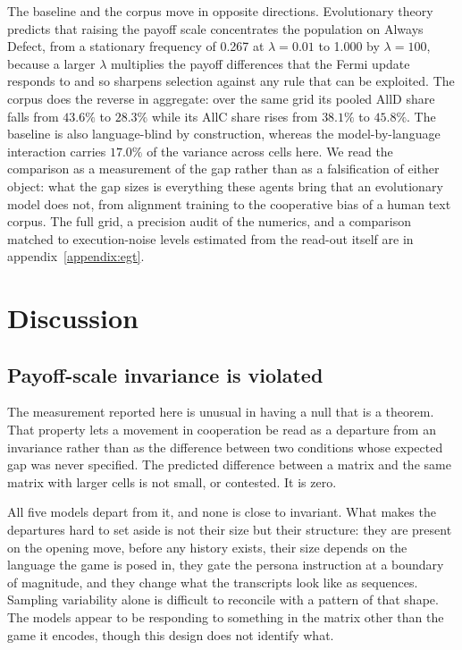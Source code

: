 \documentclass[openacc]{rsproca_new}
\newcommand{\lam}{\lambda}
\begin{document}
The baseline and the corpus move in opposite directions. Evolutionary theory
predicts that raising the payoff scale concentrates the population on Always
Defect, from a stationary frequency of 0.267 at $\lam = 0.01$ to 1.000 by
$\lam = 100$, because a larger $\lam$ multiplies the payoff differences that
the Fermi update responds to and so sharpens selection against any rule that
can be exploited. The corpus does the
reverse in aggregate: over the same grid its pooled AllD share falls from
$43.6\%$ to $28.3\%$ while its AllC share rises from $38.1\%$ to $45.8\%$. The
baseline is also language-blind by construction, whereas the
model-by-language interaction carries $17.0\%$ of the variance across cells
here. We read the comparison as a measurement of the gap rather than as a
falsification of either object: what the gap sizes is everything these agents
bring that an evolutionary model does not, from alignment training to the
cooperative bias of a human text corpus. The full grid, a precision audit of
the numerics, and a comparison matched to execution-noise levels estimated from
the read-out itself are in appendix~\ref{appendix:egt}.


\section{Discussion}\label{sec:discussion}

\subsection{Payoff-scale invariance is violated}\label{sec:disc_invariance}

The measurement reported here is unusual in having a null that is a theorem.
That property lets a movement in cooperation be read as a departure from an
invariance rather than as the difference between two conditions whose expected
gap was never specified. The predicted difference between a matrix and the same
matrix with larger cells is not small, or contested. It is zero.

All five models depart from it, and none is close to invariant. What makes the
departures hard to set aside is not their size but their structure: they are
present on the opening move, before any history exists, their size depends on
the language the game is posed in, they gate the persona instruction at a
boundary of magnitude, and they change what the transcripts look like as
sequences. Sampling variability alone is difficult to reconcile with a pattern
of that shape. The models appear to be responding to something in the matrix
other than the game it encodes, though this design does not identify what.
\end{document}
